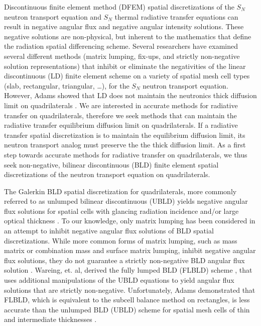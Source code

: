 \documentclass{mc2015}
\begin{document}
Discontinuous finite element method (DFEM) spatial discretizations of the $S_N$ neutron transport equation and $S_N$ thermal radiative transfer equations can result in negative angular flux and negative angular intensity solutions.  
These negative solutions are non-physical, but inherent to the mathematics that define the radiation spatial differencing scheme.
Several researchers have examined several different methods (matrix lumping\cite{adams_dfem}, fix-ups\cite{fichtl}, and strictly non-negative solution representations\cite{csz_me}) that inhibit or eliminate the negativities of the linear discontinuous (LD) finite element scheme on  a variety of spatial mesh cell types (slab, rectangular, triangular, \dots), for the $S_N$ neutron transport equation.
However, Adams showed that LD does not maintain the neutronics thick diffusion limit on quadrilaterals \cite{adams_dfem}.
We are interested in accurate methods for radiative transfer on quadrilaterals, therefore we seek methods that can maintain the radiative transfer equilibrium diffusion limit on quadrilaterals.
If a radiative transfer spatial discretization is to maintain the equilibrium diffusion limit, its neutron transport analog must preserve the the thick diffusion limit.
As a first step towards accurate methods for radiative transfer on quadrilaterals, we thus seek non-negative, bilinear discontinuous (BLD) finite element spatial discretizations of the neutron transport equation on quadrilaterals.

The Galerkin BLD spatial discretization for quadrilaterals, more commonly referred to as unlumped bilinear discontinuous (UBLD) yields negative angular flux solutions for spatial cells with glancing radiation incidence and/or large optical thickness \cite{adams_dfem}. 
To our knowledge, only matrix lumping has been considered  in an attempt to inhibit negative angular flux solutions of BLD spatial discretizations.
While more common forms of matrix lumping, such as mass matrix or combination mass and surface matrix lumping, inhibit negative angular flux solutions, they do not guarantee a strictly non-negative BLD angular flux solution \cite{adams_dfem}.
Wareing, et. al, derived the fully lumped BLD (FLBLD) scheme \cite{flbld}, that uses additional manipulations of the UBLD equations to yield angular flux solutions that are strictly non-negative.
Unfortunately, Adams demonstrated that FLBLD, which is equivalent to the subcell balance method on rectangles, is less accurate than the unlumped BLD (UBLD) scheme for spatial mesh cells of thin and intermediate thicknesses \cite{adams_scb}.
\end{document}
